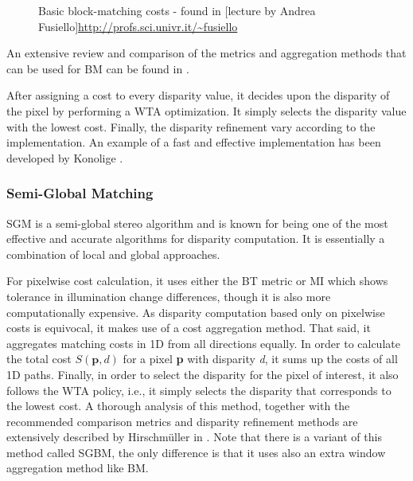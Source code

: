\begin{figure}[H]
  \caption{Basic block-matching costs - found in [lecture by Andrea Fusiello]\url{http://profs.sci.univr.it/~fusiello
}}
  \label{block_matching_costs}
\end{figure}


An extensive review and comparison of the metrics and aggregation methods that can be used for \acs{BM} can be found in \cite{Tombari2008a} \cite{Patil2013a}.

After assigning a cost to every disparity value, it decides upon the disparity of the pixel by performing a \acs{WTA} optimization. It simply selects the disparity value with the lowest cost. Finally, the disparity refinement vary according to the implementation. An example of a fast and effective implementation has been developed by Konolige \cite{Konolige1998}.

\subsubsection{Semi-Global Matching}

\ac{SGM} \cite{Hirschmuller2007} is a semi-global stereo algorithm and is known for being one of the most effective and accurate algorithms for disparity computation. It is essentially a combination of local and global approaches.

For pixelwise cost calculation, it uses either the \acs{BT} metric or \ac{MI} which shows tolerance in illumination change differences, though it is also more computationally expensive. As disparity computation based only on pixelwise costs is equivocal, it makes use of a cost aggregation method. That said, it aggregates matching costs in 1D from all directions equally. In order to calculate the total cost $S(\textbf{p},\textit{d})$ for a pixel \textbf{p} with disparity \textit{d}, it sums up the costs of all 1D paths. Finally, in order to select the disparity for the pixel of interest, it also follows the \acs{WTA} policy, i.e., it simply selects the disparity that corresponds to the lowest cost. A thorough analysis of this method, together with the recommended comparison metrics and disparity refinement methods are extensively described by Hirschmüller in \cite{Hirschmuller2007}. Note that there is a variant of this method called \ac{SGBM}, the only difference is that it uses also an extra window aggregation method like \ac{BM}.


